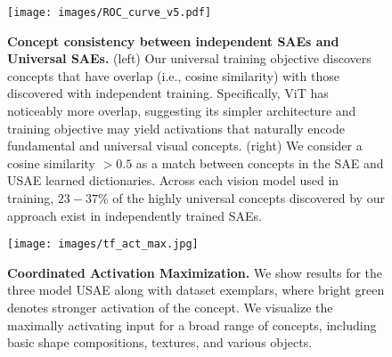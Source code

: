 \begin{figure}
    \centering
    \begin{minipage}{0.48\linewidth}  %
        \centering
        \texttt{[image: images/ROC\_curve\_v5.pdf]}
    \end{minipage}%
    \hfill
    \begin{minipage}{0.48\linewidth} %
        \centering
    \end{minipage}
    \vspace{-0.3cm}
    \caption{\textbf{Concept consistency between independent SAEs and Universal SAEs.} (left) Our universal training objective discovers concepts that have overlap (i.e., cosine similarity) with those discovered with independent training. Specifically, ViT has noticeably more overlap, suggesting its simpler architecture and training objective may yield activations that naturally encode fundamental and universal visual concepts. (right) We consider a cosine similarity $>0.5$ as a match between concepts in the SAE and USAE learned dictionaries. Across each vision model used in training, $23-37\%$ of the highly universal concepts discovered by our approach exist in independently trained SAEs.}
    \label{fig:ROC_MCS}
    \vspace{-15pt}
\end{figure} 

\begin{figure*}[t]
    \centering
    \texttt{[image: images/tf\_act\_max.jpg]}
        \vspace{-13pt}
    \caption{\textbf{Coordinated Activation Maximization.} We show results for the three model USAE along with dataset exemplars, where bright green denotes stronger activation of the concept. We visualize the maximally activating input for a broad range of concepts, including basic shape compositions, textures, and various objects.
    }
    \vspace{-15pt}
    \label{fig:act_max_results}
\end{figure*}

